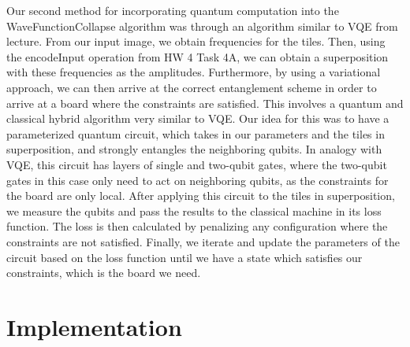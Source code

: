 \documentclass[10pt]{article}
\begin{document}
\indent Our second method for incorporating quantum computation into the WaveFunctionCollapse algorithm was through an algorithm similar to VQE from lecture. From our input image, we obtain frequencies for the tiles. Then, using the encodeInput operation from HW 4 Task 4A, we can obtain a superposition with these frequencies as the amplitudes. Furthermore, by using a variational approach, we can then arrive at the correct entanglement scheme in order to arrive at a board where the constraints are satisfied. This involves a quantum and classical hybrid algorithm very similar to VQE. Our idea for this was to have a parameterized quantum circuit, which takes in our parameters and the tiles in superposition, and strongly entangles the neighboring qubits. In analogy with VQE, this circuit has layers of single and two-qubit gates, where the two-qubit gates in this case only need to act on neighboring qubits, as the constraints for the board are only local. After applying this circuit to the tiles in superposition, we measure the qubits and pass the results to the classical machine in its loss function. The loss is then calculated by penalizing any configuration where the constraints are not satisfied. Finally, we iterate and update the parameters of the circuit based on the loss function until we have a state which satisfies our constraints, which is the board we need.

\section{Implementation}
\end{document}
